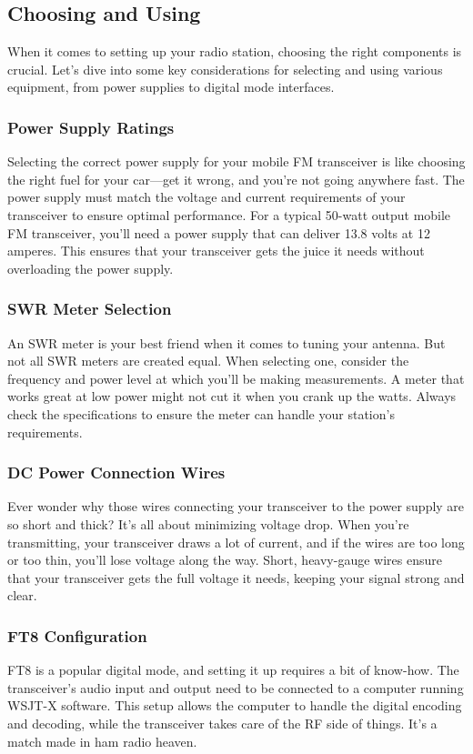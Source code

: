 \subsection{Choosing and Using}
\label{subsec:psu-choice}

When it comes to setting up your radio station, choosing the right components is crucial. Let's dive into some key considerations for selecting and using various equipment, from power supplies to digital mode interfaces.

\subsubsection*{Power Supply Ratings}
Selecting the correct power supply for your mobile FM transceiver is like choosing the right fuel for your car—get it wrong, and you're not going anywhere fast. The power supply must match the voltage and current requirements of your transceiver to ensure optimal performance. For a typical 50-watt output mobile FM transceiver, you'll need a power supply that can deliver 13.8 volts at 12 amperes. This ensures that your transceiver gets the juice it needs without overloading the power supply.

\subsubsection*{SWR Meter Selection}
An SWR meter is your best friend when it comes to tuning your antenna. But not all SWR meters are created equal. When selecting one, consider the frequency and power level at which you'll be making measurements. A meter that works great at low power might not cut it when you crank up the watts. Always check the specifications to ensure the meter can handle your station's requirements.

\subsubsection*{DC Power Connection Wires}
Ever wonder why those wires connecting your transceiver to the power supply are so short and thick? It's all about minimizing voltage drop. When you're transmitting, your transceiver draws a lot of current, and if the wires are too long or too thin, you'll lose voltage along the way. Short, heavy-gauge wires ensure that your transceiver gets the full voltage it needs, keeping your signal strong and clear.

\subsubsection*{FT8 Configuration}
FT8 is a popular digital mode, and setting it up requires a bit of know-how. The transceiver's audio input and output need to be connected to a computer running WSJT-X software. This setup allows the computer to handle the digital encoding and decoding, while the transceiver takes care of the RF side of things. It's a match made in ham radio heaven.

